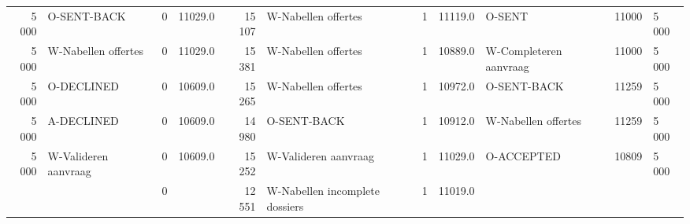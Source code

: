 \begin{tabular}{rlrlrlrllll}
5 000 & O-SENT-BACK & 0 & 11029.0 & 15 107 & W-Nabellen offertes & 1 & 11119.0 & O-SENT & 11000 & 5 000 \\
5 000 & W-Nabellen offertes & 0 & 11029.0 & 15 381 & W-Nabellen offertes & 1 & 10889.0 & W-Completeren aanvraag & 11000 & 5 000 \\
5 000 & O-DECLINED & 0 & 10609.0 & 15 265 & W-Nabellen offertes & 1 & 10972.0 & O-SENT-BACK & 11259 & 5 000 \\
5 000 & A-DECLINED & 0 & 10609.0 & 14 980 & O-SENT-BACK & 1 & 10912.0 & W-Nabellen offertes & 11259 & 5 000 \\
5 000 & W-Valideren aanvraag & 0 & 10609.0 & 15 252 & W-Valideren aanvraag & 1 & 11029.0 & O-ACCEPTED & 10809 & 5 000 \\
 &  & 0 &  & 12 551 & W-Nabellen incomplete dossiers & 1 & 11019.0 &  &  &  \\
\bottomrule
\end{tabular}
